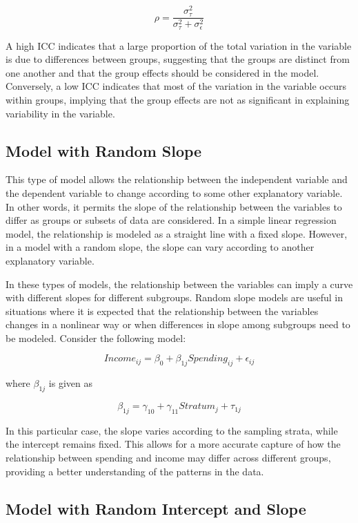 \documentclass[
  12pt,
]{book}
\begin{document}
\[
\rho = \frac{\sigma_{\tau}^{2}}{\sigma_{\tau}^{2} + \sigma_{\epsilon}^{2}}
\]

A high ICC indicates that a large proportion of the total variation in the variable is due to differences between groups, suggesting that the groups are distinct from one another and that the group effects should be considered in the model. Conversely, a low ICC indicates that most of the variation in the variable occurs within groups, implying that the group effects are not as significant in explaining variability in the variable.

\hypertarget{model-with-random-slope}{%
\subsection{Model with Random Slope}\label{model-with-random-slope}}

This type of model allows the relationship between the independent variable and the dependent variable to change according to some other explanatory variable. In other words, it permits the slope of the relationship between the variables to differ as groups or subsets of data are considered. In a simple linear regression model, the relationship is modeled as a straight line with a fixed slope. However, in a model with a random slope, the slope can vary according to another explanatory variable.

In these types of models, the relationship between the variables can imply a curve with different slopes for different subgroups. Random slope models are useful in situations where it is expected that the relationship between the variables changes in a nonlinear way or when differences in slope among subgroups need to be modeled. Consider the following model:

\[
Income_{ij} = \beta_{0} + \beta_{1j} Spending_{ij} + \epsilon_{ij}
\]

where \(\beta_{1j}\) is given as

\[
\beta_{1j} = \gamma_{10} + \gamma_{11} Stratum_{j} + \tau_{1j}
\]

In this particular case, the slope varies according to the sampling strata, while the intercept remains fixed. This allows for a more accurate capture of how the relationship between spending and income may differ across different groups, providing a better understanding of the patterns in the data.

\hypertarget{model-with-random-intercept-and-slope}{%
\subsection{Model with Random Intercept and Slope}\label{model-with-random-intercept-and-slope}}
\end{document}
